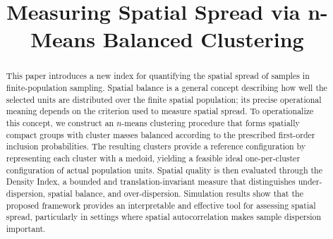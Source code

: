 \documentclass[12pt]{imsart}
\theoremstyle{plain}
\theoremstyle{remark}
\begin{document}
\begin{frontmatter}
\title{Measuring Spatial Spread via n-Means Balanced Clustering}

\begin{aug}


\end{aug}

\begin{abstract}
This paper introduces a new index for quantifying the spatial spread of
samples in finite-population sampling. Spatial balance is a
general concept describing how well the selected units are distributed over
the finite spatial population; its precise operational meaning depends on the
criterion used to measure spatial spread. To operationalize
this concept, we construct an \(n\)-means clustering procedure that forms
spatially compact groups with cluster masses balanced according to the
prescribed first-order inclusion probabilities. The resulting clusters
provide a reference configuration by representing each cluster with a medoid,
yielding a feasible ideal one-per-cluster configuration of actual population
units. Spatial quality is then evaluated through the Density Index, a
bounded and translation-invariant measure that distinguishes under-dispersion,
spatial balance, and over-dispersion. Simulation results show that the proposed
framework provides an interpretable and effective tool for assessing spatial
spread, particularly in settings where spatial autocorrelation makes sample
dispersion important.
\end{abstract}

\begin{keyword}[class=MSC]
\end{keyword}

\begin{keyword}
\end{keyword}
\end{frontmatter}
\end{document}
